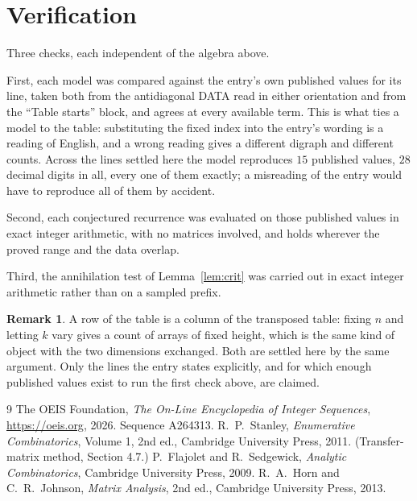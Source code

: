 \documentclass[11pt,a4paper]{article}
\theoremstyle{plain}
\theoremstyle{definition}
\newtheorem{remark}[theorem]{Remark}
\begin{document}
\section{Verification}

Three checks, each independent of the algebra above.

First, each model was compared against the entry's own published values for its line, taken
both from the antidiagonal DATA read in either orientation and from the ``Table starts''
block, and agrees at every available term. This is what ties a model to the table:
substituting the fixed index into the entry's wording is a reading of English, and a wrong
reading gives a different digraph and different counts. Across the lines settled here the
model reproduces $15$ published values, $28$ decimal digits in all, every one of
them exactly; a misreading of the entry would have to reproduce all of them by accident.

Second, each conjectured recurrence was evaluated on those published values in exact
integer arithmetic, with no matrices involved, and holds wherever the proved range and the
data overlap.

Third, the annihilation test of Lemma~\ref{lem:crit} was carried out in exact integer
arithmetic rather than on a sampled prefix.

\begin{remark}
A row of the table is a column of the transposed table: fixing $n$ and letting $k$ vary gives a
count of arrays of fixed height, which is the same kind of object with the two dimensions
exchanged. Both are settled here by the same argument. Only the lines the entry states
explicitly, and for which enough published values exist to run the first check above, are
claimed.
\end{remark}

\begin{thebibliography}{9}
 The OEIS Foundation, \emph{The On-Line Encyclopedia of Integer
Sequences}, \url{https://oeis.org}, 2026. Sequence A264313.
 R.~P.~Stanley, \emph{Enumerative Combinatorics}, Volume 1, 2nd ed.,
Cambridge University Press, 2011. (Transfer-matrix method, Section 4.7.)
 P.~Flajolet and R.~Sedgewick, \emph{Analytic Combinatorics}, Cambridge
University Press, 2009.
 R.~A.~Horn and C.~R.~Johnson, \emph{Matrix Analysis}, 2nd ed., Cambridge
University Press, 2013.
\end{thebibliography}
\end{document}
